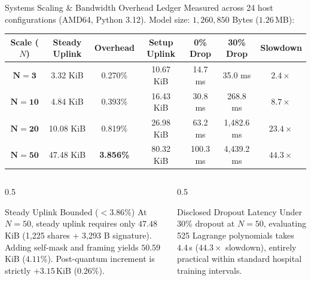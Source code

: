 \documentclass[aspectratio=169,10pt]{beamer}
\begin{document}
\begin{frame}{Systems Scaling \& Bandwidth Overhead Ledger}
  \small
  Measured across 24 host configurations (AMD64, Python 3.12). Model size: $1{,}260{,}850$ Bytes ($1.26$\,MB):
  \vspace{0.1cm}
  \begin{table}[h]
    \centering
    \scriptsize
    \begin{tabular}{@{}ccccccc@{}}
      \toprule
      \textbf{Scale ($N$)} & \textbf{Steady Uplink} & \textbf{Overhead} & \textbf{Setup Uplink} & \textbf{0\% Drop} & \textbf{30\% Drop} & \textbf{Slowdown} \\
      \midrule
      $\mathbf{N = 3}$  & 3.32 KiB  & 0.270\% & 10.67 KiB & 14.7 ms  & 35.0 ms    & $2.4\times$ \\
      $\mathbf{N = 10}$ & 4.84 KiB  & 0.393\% & 16.43 KiB & 30.8 ms  & 268.8 ms   & $8.7\times$ \\
      $\mathbf{N = 20}$ & 10.08 KiB & 0.819\% & 26.98 KiB & 63.2 ms  & 1,482.6 ms & $23.4\times$ \\
      $\mathbf{N = 50}$ & 47.48 KiB & \textbf{3.856\%} & 80.32 KiB & 100.3 ms & 4,439.2 ms & $\mathbf{44.3\times}$ \\
      \bottomrule
    \end{tabular}
  \end{table}
  \begin{columns}[T]
    \begin{column}{0.5\textwidth}
      \begin{block}{Steady Uplink Bounded ($<3.86\%$)}
        \scriptsize
        At $N=50$, steady uplink requires only $47.48$\,KiB (1,225 shares + 3,293 B signature). Adding self-mask and framing yields $50.59$\,KiB ($4.11\%$). Post-quantum increment is strictly $+3.15$\,KiB ($0.26\%$).
      \end{block}
    \end{column}
    \begin{column}{0.5\textwidth}
      \begin{block}{Disclosed Dropout Latency}
        \scriptsize
        Under 30\% dropout at $N=50$, evaluating 525 Lagrange polynomials takes $4.4$\,s ($44.3\times$ slowdown), entirely practical within standard hospital training intervals.
      \end{block}
    \end{column}
  \end{columns}
\end{frame}
\end{document}
